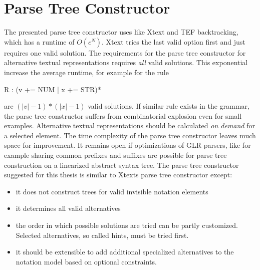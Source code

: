 \section{Parse Tree Constructor}
The presented parse tree constructor uses like Xtext and TEF backtracking, which has a runtime of $O(c^N)$. Xtext tries the last valid option first and just requires one valid solution. The requirements for the parse tree constructor for alternative textual representations requires \emph{all} valid solutions. This exponential increase the average runtime, for example for the rule
\begin{xtxt}
R : (v += NUM | x += STR)*
\end{xtxt}
are $( |v| - 1 ) * ( |x| - 1)$ valid solutions. If similar rule exists in the grammar, the parse tree constructor suffers from combinatorial explosion even for small examples.  Alternative textual representations should be calculated \emph{on demand} for a selected element. The time complexity of the parse tree constructor leaves much space for improvement. It remains open if optimizations of GLR parsers, like for example sharing common prefixes and suffixes are possible for parse tree construction on a linearized abstract syntax tree. The parse tree constructor suggested for this thesis is similar to Xtexts parse tree constructor except:
\begin{itemize}
	\item it does not construct trees for valid invisible notation elements
	\item it determines all valid alternatives
	\item the order in which possible solutions are tried can be partly customized. Selected alternatives, so called hints, must be tried first.
	\item it should be extensible to add additional specialized alternatives to the notation model based on optional constraints.
\end{itemize}

